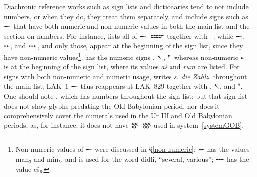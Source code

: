 \documentclass[10pt, a4paper, twoside]{article}
\newcommand\oneAšC{{\proposalfont\symbol{"12550}}} %
\newcommand\nineAšC{{\proposalfont\symbol{"12558}}} %
\begin{document}
Diachronic reference works such as sign lists and dictionaries tend to not include numbers,
or when they do, they treat them separately, and include signs such as {\xsuxfont 𒀸}
that have both numeric and non-numeric values in both the main list and the section on numbers.
For instance, \cite[123 \psqq]{KWU} lists all of {\xsuxfont 𒀸}--{\xsuxfont 𒐇} together with
{\oneAšC}--{\nineAšC},
while {\xsuxfont 𒀸}, {\xsuxfont 𒐀}, and {\xsuxfont 𒐁}, and only those, appear at the beginning of the sign list,
since they have non-numeric values\footnote{Non-numeric values of {\xsuxfont 𒀸} were discussed in
§\ref{non-numeric};
{\xsuxfont 𒐀} has the values man₃ and min₅, and is used for the word didli, ``several, various'';
{\xsuxfont 𒐁} has the value eš₆.}.
\cite[58]{PTACE} has the numeric signs {\oneAšC}, {\xsuxfont 𒀹}, {\xsuxfont 𒁹},
whereas non-numeric {\xsuxfont 𒀸} is at the beginning of the sign list,
where its values \emph{aš} and \emph{rum} are listed.
For signs with both non-numeric and numeric usage, \cite{LAK} writes \emph{\textgerman{s. die Zahlz.}}
throughout the main list; LAK~1 {\xsuxfont 𒀸} thus reappears at LAK~829 together with
{\oneAšC}, {\xsuxfont 𒀹}, and {\xsuxfont 𒁹}.
One should note \cite{MZL}, which has numbers throughout the sign list;
but that sign list does not show glyphs predating the Old Babylonian period,
nor does it comprehensively cover the numerals used in the Ur III and Old Babylonian
periods, as, for instance, it does not have {\xsuxfont 𒐒}--{\xsuxfont 𒐔} used in
system~\ref{systemGOB}.
\end{document}
